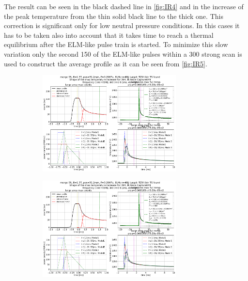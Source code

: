 The result can be seen in the black dashed line in \autoref{fig:IR4} and in the increase of the peak temperature from the thin solid black line to the thick one. This correction is significant only for low neutral pressure conditions. In this cases it has to be taken also into account that it takes time to reach a thermal equilibrium after the ELM-like pulse train is started. To minimize this slow variation only the second 150 of the ELM-like pulses within a 300 strong scan is used to construct the average profile as it can be seen from \autoref{fig:IR5}.

\begin{figure}[!ht]
     \centering
     \begin{subfigure}{0.7\linewidth}
         \centering
        \hspace*{-5mm}
         \includegraphics[width=0.8\textwidth,trim={510 5 5 415},clip]{Chapters/chapter3/figs/file_index_394_IR_trace_Capture049_43.png}
         \caption{\phantom{ww}}
         \label{fig:IR6a}
     \end{subfigure}
     \hfill
    \begin{subfigure}{0.7\linewidth}
         \centering
         \includegraphics[width=0.8\textwidth,trim={5 5 515 415},clip]{Chapters/chapter3/figs/file_index_394_IR_trace_Capture049_43.png}

\end{subfigure}
\end{figure}
